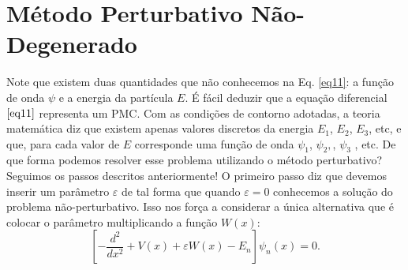 \documentclass{article}
\begin{document}
\section{Método Perturbativo Não-Degenerado}

Note que existem duas quantidades que não conhecemos na Eq. \eqref{eq11}: a função de onda $\psi$ e a energia da partícula $E$. É fácil deduzir que a equação diferencial $\eqref{eq11}$ representa um PMC. Com as condições de contorno adotadas, a teoria matemática diz que existem apenas valores discretos da energia $E_1$, $E_2$, $E_3$, etc, e que, para cada valor de $E$ corresponde uma função de onda $\psi_1$, $\psi_2,$, $\psi_3$ , etc. De que forma podemos resolver esse problema utilizando o método perturbativo? Seguimos os passos descritos anteriormente! O primeiro passo diz que devemos inserir um parâmetro $\varepsilon$ de tal forma que quando $\varepsilon = 0$ conhecemos a solução do problema não-perturbativo. Isso nos força a considerar a única alternativa que é colocar o parâmetro multiplicando a função $W(x)$:
\begin{equation}
    \left[ -\frac{d^2}{dx^2} +V(x)+\varepsilon W(x)-E_n \right]\psi_n (x) = 0.
    \label{eq12}
\end{equation}
\end{document}
